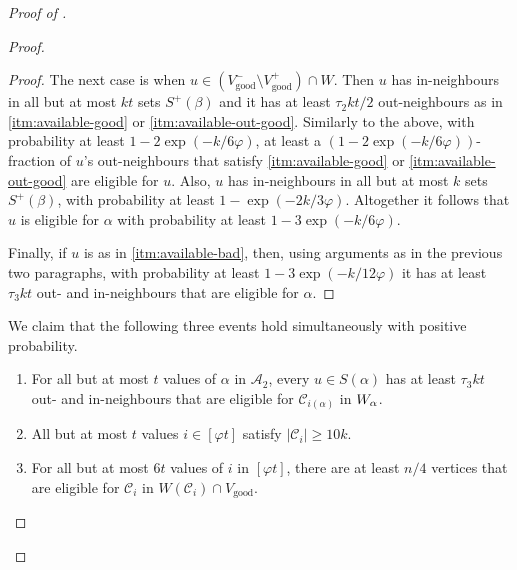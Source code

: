 \documentclass[english]{article}
\theoremstyle{plain}
\theoremstyle{remark}
\def\C{\mathcal{C}}
\let\phi\varphi
\def \Sp {S^+}
\def \Vgp {V_{\good}^+}
\def \Vgp {V_{\good}^+}
\def \Vgm {V_{\good}^-}
\def \Vg {V_{\good}}
\def \Vgm {V_{\good}^-}
\newcommand{\A}{\mathcal{A}}
\DeclareMathOperator{\good}{good}
\begin{document}
\begin{proof}[Proof of ]
\begin{proof}
\begin{proof}
				The next case is when $u \in (\Vgm \setminus \Vgp) \cap W$. Then $u$ has in-neighbours in all but at most $kt$ sets $\Sp(\beta)$ and it has at least $\tau_2 kt/2$ out-neighbours as in \ref{itm:available-good} or \ref{itm:available-out-good}. 
				Similarly to the above, with probability at least $1 - 2\exp(-k/6\phi)$, at least a $(1 - 2\exp(-k/6\phi))$-fraction of $u$'s out-neighbours that satisfy \ref{itm:available-good} or \ref{itm:available-out-good} are eligible for $u$. Also, $u$ has in-neighbours in all but at most $k$ sets $\Sp(\beta)$, with probability at least $1 - \exp(-2k/3\phi)$. Altogether it follows that $u$ is eligible for $\alpha$ with probability at least $1 - 3\exp(-k/6\phi)$.

				Finally, if $u$ is as in \ref{itm:available-bad}, then, using arguments as in the previous two paragraphs, with probability at least $1 - 3\exp(-k/12\phi)$ it has at least $\tau_3 kt$ out- and in-neighbours that are eligible for $\alpha$. 
			\end{proof}

			We claim that the following three events hold simultaneously with positive probability.
			\begin{enumerate}[label = \rm(\alph*)]
				\item \label{itm:eligible-many-neighs-element}
					For all but at most $t$ values of $\alpha$ in $\A_2$, every $u \in S(\alpha)$ has at least $\tau_3 kt$ out- and in-neighbours that are eligible for $\C_{i(\alpha)}$ in $W_{\alpha}$.
				\item \label{itm:eligible-equal-parts}
					All but at most $t$ values $i \in [\phi t]$ satisfy $|\C_i| \ge 10k$.
				\item \label{itm:eligible-many-neighs-part}
					For all but at most $6t$ values of $i$ in $[\phi t]$, there are at least $n/4$ vertices that are eligible for $\C_i$ in $W(\C_i) \cap \Vg$.
			\end{enumerate}


\end{proof}
\end{proof}
\end{document}
